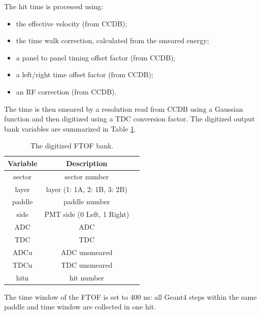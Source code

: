 The hit time is processed using:

\begin{itemize}
	\item the effective velocity (from CCDB);
	\item the time walk correction, calculated from the smeared energy;
	\item a panel to panel timing offset factor (from CCDB);
	\item a left/right time offset factor (from CCDB);
	\item an RF correction (from CCDB).
\end{itemize}

The time is then smeared by a resolution read from CCDB using a Gaussian function and then digitized using a TDC conversion factor.
The digitized output bank variables are summarized in Table \ref{tab:ftofBank}.

\begin{table}[h]
	\begin{center}
		\begin{tabular}{| c | c | c |}
			\hline \hline
			Variable  & Description                                 \\
			\hline
              sector  &                             sector number   \\
               layer  &               layer (1: 1A, 2: 1B, 3: 2B)   \\
              paddle  &                             paddle number   \\
                side  &                PMT side (0 Left, 1 Right)   \\
                 ADC  &                                       ADC   \\
                 TDC  &                                       TDC   \\
                ADCu  &                             ADC unsmeared   \\
                TDCu  &                             TDC unsmeared   \\
                hitn  &                                hit number   \\
			\hline \hline
		\end{tabular}
	\end{center}
	\caption{The digitized FTOF bank.}\label{tab:ftofBank}
\end{table}


The time window  of the FTOF is set to 400 ns: all Geant4 steps within the same paddle and time window are collected in one hit.


